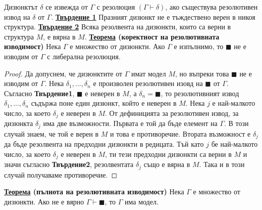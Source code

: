 \documentclass{article}
\begin{document}
Дизюнктът $\delta$ се извежда от $\Gamma$ с резолюция $(\Gamma \vdash \delta)$, ако съществува резолютивен извод на $\delta$ от $\Gamma$. \newline\newline
\textbf{\underline{Твърдение 1}} \newline
Празният дизюнкт не е тъждествено верен в никоя структура. \newline\newline
\textbf{\underline{Твърдение 2}} \newline
Всяка резолвента на дизюнкти, които са верни в структура $M$, е вярна в $M$. \newline\newline
\textbf{\underline{Теорема} (коректност на резолютивната изводимост)} \newline
Нека $\Gamma$ е множество от дизюнкти. Ако $\Gamma$ е изпълнимо, то $\blacksquare$ не е изводим от $\Gamma$ с либерална резолюция.
\begin{proof}
Да допуснем, че дизюнктите от $\Gamma$ имат модел $M$, но въпреки това $\blacksquare$ не е изводим от $\Gamma$. Нека $\delta_1, ..., \delta_n$
е произволен резолютивен изовд на $\blacksquare$ от $\Gamma$. Съгласно \textbf{Твърдение1}, $\blacksquare$ е неверен в $M$, а $\delta_n = \blacksquare$,
то резолютивният извод $\delta_1, ..., \delta_n$ съдържа поне един дизюнкт, който е неверен в $M$. Нека $j$ е най-малкото число, за което $\delta_j$
е неверен в $M$. От дефиницията за резолютивен извод, за дизюнкта $\delta_j$ има две възможности. Първата е той да бъде елемент на $\Gamma$. В този случай знаем, че
той е верен в $M$ и това е противоречие. Втората възможност е $\delta_j$ да бъде резолвента на предходни дизюнкти в редицата. Тъй като $j$ бе най-малкото
число, за което $\delta_j$ е неверен в $M$, ти тези предходни дизюнкти са верни в $M$ и значи съгласно \textbf{Твърдение2}, резолвентата $\delta_j$ също е вярна
в $M$. Така и в този случай получаваме противоречие.
\end{proof}
\textbf{\underline{Теорема} (пълнота на резолютивната изводимост)} \newline
Нека $\Gamma$ е множество от дизюнкти. Ако не е вярно $\Gamma \vdash \blacksquare$, то $\Gamma$ има модел.

\section*{\centering \color{bordeaux}{Бази от данни}}

\subsection*{\color{bordeaux}{23. Бази от данни. Релационен модел на данните.}}
\end{document}
